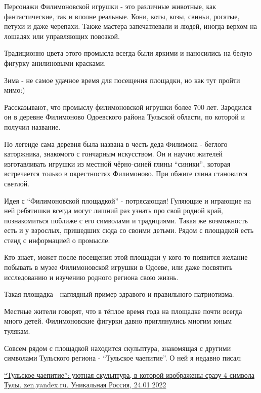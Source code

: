 Персонажи Филимоновской игрушки - это различные животные, как фантастические,
так и вполне реальные. Кони, коты, козы, свиньи, рогатые, петухи и даже
черепахи. Также мастера запечатлевали и людей, иногда верхом на лошадях или
управляющих повозкой.

Традиционно цвета этого промысла всегда были яркими и наносились на белую
фигурку анилиновыми красками. 

Зима - не самое удачное время для посещения площадки, но как тут пройти мимо:)

Рассказывают, что промыслу филимоновской игрушки более 700 лет. Зародился он в
деревне Филимоново Одоевского района Тульской области, по которой и получил
название. 

\begin{zznagolos}
По легенде сама деревня была названа в честь деда Филимона - беглого
каторжника, знакомого с гончарным искусством. Он и научил жителей изготавливать
игрушки из местной чёрно-синей глины \enquote{синики}, которая встречается только в
окрестностях Филимоново. При обжиге глина становится светлой.	
\end{zznagolos}


Идея с \enquote{Филимоновской площадкой} - потрясающая! Гуляющие и играющие на ней
ребятишки всегда могут лишний раз узнать про свой родной край, познакомиться
поближе с его символами и традициями. Такая же возможность есть и у взрослых,
пришедших сюда со своими детьми. Рядом с площадкой есть стенд с информацией о
промысле.

Кто знает, может после посещения этой площадки у кого-то появится желание
побывать в музее Филимоновской игрушки в Одоеве, или даже посвятить
исследованию и изучению родного региона свою жизнь.

Такая площадка - наглядный пример здравого и правильного патриотизма. 

Местные жители говорят, что в тёплое время года на площадке почти всегда много
детей. Филимоновские фигурки давно приглянулись многим юным тулякам.


Совсем рядом с площадкой находится скульптура, знакомящая с другими символами
Тульского региона - \enquote{Тульское чаепитие}. О ней я недавно писал:

\href{https://zen.yandex.ru/media/id/5e52a45be977e25b8eec5de4/tulskoe-chaepitie-uiutnaia-skulptura-v-kotoroi-izobrajeny-srazu-4-simvola-tuly-61edc81c1b287f5c6d20aea5}{%
\enquote{Тульское чаепитие}: уютная скульптура, в которой изображены сразу 4 символа Тулы, %
zen.yandex.ru, Уникальная Россия, 24.01.2022%
}

